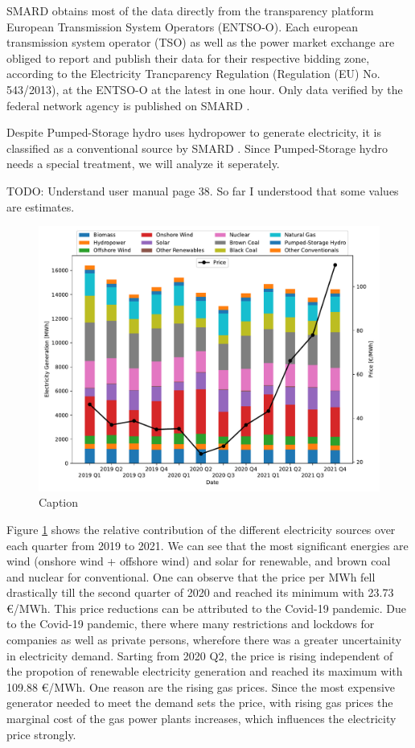 \documentclass{article}
\begin{document}
SMARD obtains most of the data directly from the transparency platform European Transmission System Operators (ENTSO-O). 
Each european transmission system operator (TSO) as well as the power market exchange are obliged to report and publish their data for their respective bidding zone, according to the Electricity Trancparency Regulation (Regulation (EU) No. 543/2013), at the ENTSO-O at the latest in one hour.
Only data verified by the federal network agency is published on SMARD \citep{smard_usermanual}.

Despite Pumped-Storage hydro uses hydropower to generate electricity, it is classified as a conventional source by SMARD \citep{smard_usermanual}. Since Pumped-Storage hydro needs a special treatment, we will analyze it seperately.  

TODO: Understand user manual page 38. So far I understood that some values are estimates.
\begin{figure}[h]
    \centering
    \includegraphics[width=0.8\columnwidth]{doc/fig/quarterly_technology_mix_with_price.pdf}
    \caption{Caption}
    \label{fig:quarterly_mix}
\end{figure}

Figure \ref{fig:quarterly_mix} shows the relative contribution of the different electricity sources over each quarter from 2019 to 2021. 
We can see that the most significant energies are wind (onshore wind + offshore wind) and solar for renewable, and brown coal and nuclear for conventional. 
One can observe that the price per MWh fell drastically till the second quarter of 2020 and reached its minimum with 23.73 €/MWh. 
This price reductions can be attributed to the Covid-19 pandemic. 
Due to the Covid-19 pandemic, there where many restrictions and lockdows for companies as well as private persons, wherefore there was a greater uncertainity in electricity demand. 
Sarting from 2020 Q2, the price is rising independent of the propotion of renewable electricity generation and reached its maximum with 109.88 €/MWh. 
One reason are the rising gas prices. Since the most expensive generator needed to meet the demand sets the price, with rising gas prices the marginal cost of the gas power plants increases, which influences the electricity price strongly. 
\end{document}
